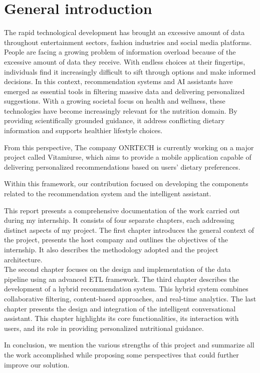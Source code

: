 \chapter*{General introduction}
 The rapid technological development has brought an excessive amount of data throughout entertainment sectors, fashion industries and social media platforms. People are facing a growing problem of information overload because of the excessive amount of data they receive. With endless choices at their fingertips, individuals find it increasingly difficult to sift through options and make informed decisions. In this context, recommendation systems and AI assistants have emerged as essential tools in filtering massive data and delivering personalized suggestions. With a growing societal focus on health and wellness, these technologies have become increasingly relevant for the nutrition domain. By providing scientifically grounded guidance, it address conflicting dietary information and supports healthier lifestyle choices.\\


\par From this perspective, The company ONRTECH is currently working on a major project called Vitamiurse, which aims to provide a mobile application capable of delivering personalized recommendations based on users' dietary preferences.

Within this framework, our contribution focused on developing the components related to the recommendation system and the intelligent assistant.

This report presents a comprehensive documentation of the work carried out
during my internship. It consists of four separate chapters, each addressing distinct aspects of my project. The first chapter introduces the general context of the project, presents the host company and outlines the objectives of the internship. It also describes the methodology adopted and the project architecture.\\
The second chapter focuses on the design and implementation of the data pipeline using an advanced ETL framework. The third chapter describes the development of a hybrid recommendation system. This hybrid system combines collaborative
filtering, content-based approaches, and real-time analytics. The last chapter presents the design and integration of the intelligent conversational assistant. This chapter highlights its core functionalities, its interaction with users, and its role in providing personalized nutritional guidance.

In conclusion, we mention the various strengths of this project and summarize all the work accomplished while proposing some perspectives that could further improve our solution.

